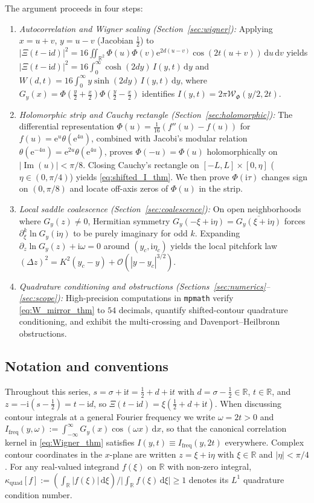 \documentclass[11pt,a4paper,reqno]{amsart}
\theoremstyle{definition}
\theoremstyle{remark}
\numberwithin{equation}{section}
\newcommand{\dd}{\mathrm{d}}
\newcommand{\ii}{\mathrm{i}}
\newcommand{\ee}{\mathrm{e}}
\newcommand{\Ima}{\operatorname{Im}}
\newcommand{\Wig}{\mathcal{W}}
\begin{document}
The argument proceeds in four steps:
\begin{enumerate}
\item \emph{Autocorrelation and Wigner scaling (Section~\ref{sec:wigner}):} Applying $x = u+v$, $y = u-v$ (Jacobian $\frac{1}{2}$) to $|\Xi(t-\ii d)|^2 = 16\iint_{\mathbb{R}^2}\Phi(u)\Phi(v)\ee^{2d(u-v)}\cos(2t(u+v))\,\dd u\,\dd v$ yields $|\Xi(t-\ii d)|^2 = 16\int_0^\infty \cosh(2d y)\,I(y,t)\,\dd y$ and $W(d,t) = 16\int_0^\infty y\sinh(2d y)\,I(y,t)\,\dd y$, where $G_y(x) = \Phi(\frac{y}{2}+\frac{x}{2})\Phi(\frac{y}{2}-\frac{x}{2})$ identifies $I(y,t) = 2\pi\Wig_\Phi(y/2, 2t)$.
\item \emph{Holomorphic strip and Cauchy rectangle (Section~\ref{sec:holomorphic}):} The differential representation $\Phi(u) = \frac{1}{16}(f''(u) - f(u))$ for $f(u) = \ee^u\theta(\ee^{4u})$, combined with Jacobi's modular relation $\theta(\ee^{-4u}) = \ee^{2u}\theta(\ee^{4u})$, proves $\Phi(-u)=\Phi(u)$ holomorphically on $|\Ima(u)| < \pi/8$. Closing Cauchy's rectangle on $[-L,L]\times[0,\eta]$ ($\eta \in (0,\pi/4)$) yields \eqref{eq:shifted_I_thm}. We then prove $\Phi(\ii\tau)$ changes sign on $(0,\pi/8)$ and locate off-axis zeros of $\Phi(u)$ in the strip.
\item \emph{Local saddle coalescence (Section~\ref{sec:coalescence}):} On open neighborhoods where $G_y(z) \neq 0$, Hermitian symmetry $G_y(-\xi+\ii\eta) = \overline{G_y(\xi+\ii\eta)}$ forces $\partial^k_\xi\ln G_y(\ii\eta)$ to be purely imaginary for odd $k$. Expanding $\partial_z\ln G_y(z) + \ii\omega = 0$ around $(y_c,\ii\eta_c)$ yields the local pitchfork law $(\Delta z)^2 = K^2(y_c - y) + \mathcal{O}(|y-y_c|^{3/2})$.
\item \emph{Quadrature conditioning and obstructions (Sections~\ref{sec:numerics}--\ref{sec:scope}):} High-precision computations in \texttt{mpmath} verify \eqref{eq:W_mirror_thm} to $54$ decimals, quantify shifted-contour quadrature conditioning, and exhibit the multi-crossing and Davenport--Heilbronn obstructions.
\end{enumerate}

\subsection{Notation and conventions}\label{subsec:notation}

Throughout this series, $s = \sigma + \ii t = \frac{1}{2} + d + \ii t$ with $d = \sigma - \frac{1}{2} \in \mathbb{R}$, $t \in \mathbb{R}$, and $z = -\ii(s-\frac{1}{2}) = t - \ii d$, so $\Xi(t-\ii d) = \xi(\frac{1}{2}+d+\ii t)$. When discussing contour integrals at a general Fourier frequency we write $\omega = 2t > 0$ and $I_{\mathrm{freq}}(y,\omega) := \int_{-\infty}^\infty G_y(x)\cos(\omega x)\,\dd x$, so that the canonical correlation kernel in \eqref{eq:Wigner_thm} satisfies $I(y,t) \equiv I_{\mathrm{freq}}(y,2t)$ everywhere. Complex contour coordinates in the $x$-plane are written $z = \xi + \ii\eta$ with $\xi \in \mathbb{R}$ and $|\eta| < \pi/4$. For any real-valued integrand $f(\xi)$ on $\mathbb{R}$ with non-zero integral, $\kappa_{\mathrm{quad}}[f] := (\int_{\mathbb{R}}|f(\xi)|\,\dd\xi)/\big|\int_{\mathbb{R}} f(\xi)\,\dd\xi\big| \ge 1$ denotes its $L^1$ quadrature condition number.
\end{document}
